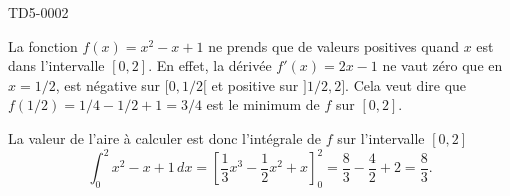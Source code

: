 
\begin{corrige}{TD5-0002}

La fonction $f(x) = x^2 - x +1$ ne prends que de valeurs positives quand $x$ est dans l'intervalle $[0,2]$. En effet, la dérivée $f'(x) = 2x -1 $ ne vaut zéro que en $x = 1/2$, est négative sur $[0,1/2[$ et positive sur $]1/2, 2]$. Cela veut dire que $ f(1/2) = 1/4  -1/2 + 1  = 3/4$ est le minimum de $f$ sur $[0,2]$.

La valeur de l'aire à calculer est donc l'intégrale de $f$ sur l'intervalle $[0,2]$
\begin{equation*}
  \int_0^2 x^2 - x +1 \, dx = \left[\frac{1}{3} x ^3 -\frac{1}{2} x^2 + x\right]_0^2 = \frac{8}{3} -\frac{4}{2} + 2 = \frac{8}{3}.
\end{equation*}

\end{corrige}
	
